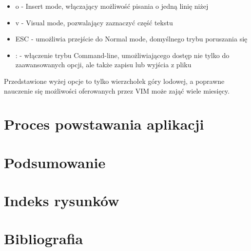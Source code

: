 \documentclass[12pt, a4paper]{article}
\begin{document}
\begin{sloppypar}
{{\begin{itemize}
\begin{itemize}
        \item o - Insert mode, włączający możliwość pisania o jedną linię niżej
        \item v - Visual mode, pozwalający zaznaczyć część tekstu
        \item ESC - umożliwia przejście do Normal mode, domyślnego trybu poruszania się
        \item : - włączenie trybu Command-line, umożliwiającego dostęp nie tylko do
        zaawansowanych opcji, ale także zapisu lub wyjścia z pliku
      \end{itemize} 
    \end{itemize}
    Przedstawione wyżej opcje to tylko wierzchołek góry lodowej, a poprawne nauczenie
    się możliwości oferowanych przez VIM może zająć wiele miesięcy.
  }
}

\section{Proces powstawania aplikacji}
{
}

\section{Podsumowanie}
{
}

\section{Indeks rysunków}

\section{Bibliografia}
{
  \printbibliography
}

\end{sloppypar}
\end{document}
